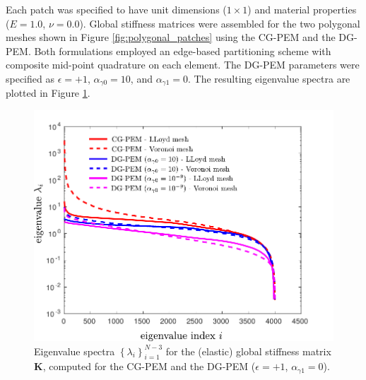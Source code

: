 Each patch was specified to have unit dimensions ($1 \times 1$) and material properties ($E = 1.0$, $\nu = 0.0$). Global stiffness matrices were assembled for the two polygonal meshes shown in Figure \ref{fig:polygonal_patches} using the CG-PEM and the DG-PEM. Both formulations employed an edge-based partitioning scheme with composite mid-point quadrature on each element. The DG-PEM parameters were specified as $\epsilon = +1$, $\alpha_{\gamma0} = 10$, and $\alpha_{\gamma1} = 0$. The resulting eigenvalue spectra are plotted in Figure \ref{fig:patch_eigenvalue_distributions}.

\begin{figure}[!h]
  \centering
  \includegraphics[width=5.0in]{figures/eigenvalue_distributions.pdf}  \caption{Eigenvalue spectra $\left\{ \lambda_i \right\}_{i = 1}^{N-3}$ for the (elastic) global stiffness matrix $\bm{K}$, computed for the CG-PEM and the DG-PEM ($\epsilon = +1$, $\alpha_{\gamma1} = 0$).}
  \label{fig:patch_eigenvalue_distributions}
\end{figure}

